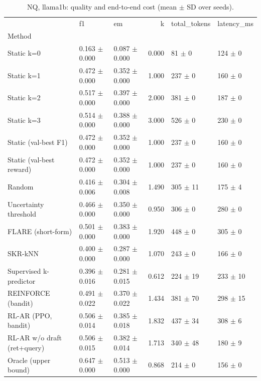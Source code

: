 \begin{table}
\caption{NQ, llama1b: quality and end-to-end cost (mean $\pm$ SD over seeds).}
\begin{tabular}{lllrll}
\toprule
 & f1 & em & k & total_tokens & latency_ms \\
Method &  &  &  &  &  \\
\midrule
Static k=0 & 0.163 $\pm$ 0.000 & 0.087 $\pm$ 0.000 & 0.000 & 81 $\pm$ 0 & 124 $\pm$ 0 \\
Static k=1 & 0.472 $\pm$ 0.000 & 0.352 $\pm$ 0.000 & 1.000 & 237 $\pm$ 0 & 160 $\pm$ 0 \\
Static k=2 & 0.517 $\pm$ 0.000 & 0.397 $\pm$ 0.000 & 2.000 & 381 $\pm$ 0 & 187 $\pm$ 0 \\
Static k=3 & 0.514 $\pm$ 0.000 & 0.388 $\pm$ 0.000 & 3.000 & 526 $\pm$ 0 & 230 $\pm$ 0 \\
Static (val-best F1) & 0.472 $\pm$ 0.000 & 0.352 $\pm$ 0.000 & 1.000 & 237 $\pm$ 0 & 160 $\pm$ 0 \\
Static (val-best reward) & 0.472 $\pm$ 0.000 & 0.352 $\pm$ 0.000 & 1.000 & 237 $\pm$ 0 & 160 $\pm$ 0 \\
Random & 0.416 $\pm$ 0.006 & 0.304 $\pm$ 0.008 & 1.490 & 305 $\pm$ 11 & 175 $\pm$ 4 \\
Uncertainty threshold & 0.466 $\pm$ 0.000 & 0.350 $\pm$ 0.000 & 0.950 & 306 $\pm$ 0 & 280 $\pm$ 0 \\
FLARE (short-form) & 0.501 $\pm$ 0.000 & 0.383 $\pm$ 0.000 & 1.920 & 448 $\pm$ 0 & 305 $\pm$ 0 \\
SKR-kNN & 0.400 $\pm$ 0.000 & 0.287 $\pm$ 0.000 & 1.070 & 243 $\pm$ 0 & 166 $\pm$ 0 \\
Supervised k-predictor & 0.396 $\pm$ 0.016 & 0.281 $\pm$ 0.015 & 0.612 & 224 $\pm$ 19 & 233 $\pm$ 10 \\
REINFORCE (bandit) & 0.491 $\pm$ 0.022 & 0.370 $\pm$ 0.022 & 1.434 & 381 $\pm$ 70 & 298 $\pm$ 15 \\
RL-AR (PPO, bandit) & 0.506 $\pm$ 0.014 & 0.385 $\pm$ 0.018 & 1.832 & 437 $\pm$ 34 & 308 $\pm$ 6 \\
RL-AR w/o draft (ret+query) & 0.506 $\pm$ 0.015 & 0.382 $\pm$ 0.014 & 1.713 & 340 $\pm$ 48 & 180 $\pm$ 9 \\
Oracle (upper bound) & 0.647 $\pm$ 0.000 & 0.513 $\pm$ 0.000 & 0.868 & 214 $\pm$ 0 & 156 $\pm$ 0 \\
\bottomrule
\end{tabular}
\end{table}
